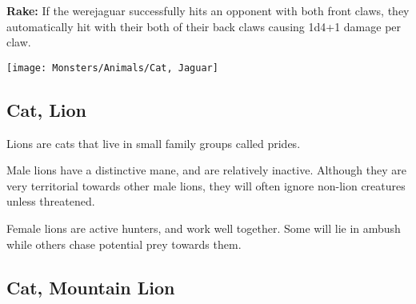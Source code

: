\begin{multicols*}{2}
\textbf{Rake:} If the werejaguar successfully hits an opponent with both front claws, they automatically hit with their both of their back claws causing 1d4+1 damage per claw.

\texttt{[image: Monsters/Animals/Cat, Jaguar]}

\subsection{Cat, Lion}

Lions are cats that live in small family groups called prides.

Male lions have a distinctive mane, and are relatively inactive. Although they are very territorial towards other male lions, they will often ignore non-lion creatures unless threatened.

Female lions are active hunters, and work well together. Some will lie in ambush while others chase potential prey towards them.

\subsection{Cat, Mountain Lion}
\end{multicols*}
